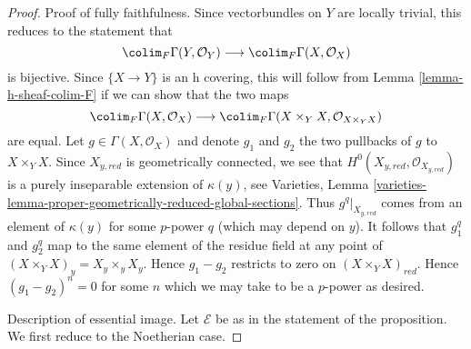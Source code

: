 \begin{proof}
Proof of fully faithfulness. Since vectorbundles on $Y$ are locally
trivial, this reduces to the statement that
$$
\colim_F \Gamma(Y, \mathcal{O}_Y)
\longrightarrow
\colim_F \Gamma(X, \mathcal{O}_X)
$$
is bijective. Since $\{X \to Y\}$ is an h covering, this will
follow from Lemma \ref{lemma-h-sheaf-colim-F} if we can show that the two maps
$$
\colim_F \Gamma(X, \mathcal{O}_X)
\longrightarrow
\colim_F \Gamma(X \times_Y X, \mathcal{O}_{X \times_Y X})
$$
are equal. Let $g \in \Gamma(X, \mathcal{O}_X)$
and denote $g_1$ and $g_2$ the two pullbacks of $g$ to $X \times_Y X$.
Since $X_{y, red}$ is geometrically connected, we
see that $H^0(X_{y, red}, \mathcal{O}_{X_{y, red}})$ is
a purely inseparable extension of $\kappa(y)$, see
Varieties, Lemma
\ref{varieties-lemma-proper-geometrically-reduced-global-sections}.
Thus $g^q|_{X_{y, red}}$ comes from an element of
$\kappa(y)$ for some $p$-power $q$ (which may depend on $y$).
It follows that $g_1^q$ and $g_2^q$ map to the same
element of the residue field at any point of
$(X \times_Y X)_y = X_y \times_y X_y$.
Hence $g_1 - g_2$ restricts to zero on $(X \times_Y X)_{red}$.
Hence $(g_1 - g_2)^n = 0$ for some $n$ which we may take
to be a $p$-power as desired.

\medskip\noindent
Description of essential image. Let $\mathcal{E}$ be as in the statement
of the proposition. We first reduce to the Noetherian case.


\end{proof}
